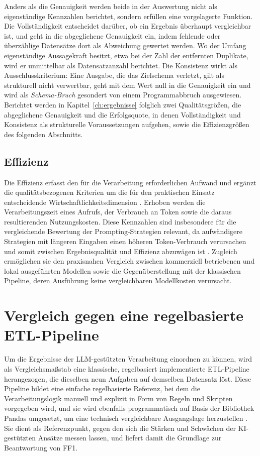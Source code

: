 Anders als die Genauigkeit werden beide in der Auswertung nicht als eigenständige Kennzahlen berichtet, sondern erfüllen eine vorgelagerte Funktion. Die Vollständigkeit entscheidet darüber, ob ein Ergebnis überhaupt vergleichbar ist, und geht in die abgeglichene Genauigkeit ein, indem fehlende oder überzählige Datensätze dort als Abweichung gewertet werden. Wo der Umfang eigenständige Aussagekraft besitzt, etwa bei der Zahl der entfernten Duplikate, wird er unmittelbar als Datensatzanzahl berichtet. Die Konsistenz wirkt als Ausschlusskriterium: Eine Ausgabe, die das Zielschema verletzt, gilt als strukturell nicht verwertbar, geht mit dem Wert null in die Genauigkeit ein und wird als \emph{Schema-Bruch} gesondert von einem Programmabbruch ausgewiesen. Berichtet werden in Kapitel~\ref{ch:ergebnisse} folglich zwei Qualitätsgrößen, die abgeglichene Genauigkeit und die Erfolgsquote, in denen Vollständigkeit und Konsistenz als strukturelle Voraussetzungen aufgehen, sowie die Effizienzgrößen des folgenden Abschnitts.

\subsection{Effizienz}
\label{subsec:effizienz}

Die Effizienz erfasst den für die Verarbeitung erforderlichen Aufwand und ergänzt die qualitätsbezogenen Kriterien um die für den praktischen Einsatz entscheidende Wirtschaftlichkeitsdimension \autocite{changEfficientPromptingMethods2024,2026AIIndex}. Erhoben werden die Verarbeitungszeit eines Aufrufs, der Verbrauch an Token sowie die daraus resultierenden Nutzungskosten. Diese Kennzahlen sind insbesondere für die vergleichende Bewertung der Prompting-Strategien relevant, da aufwändigere Strategien mit längeren Eingaben einen höheren Token-Verbrauch verursachen und somit zwischen Ergebnisqualität und Effizienz abzuwägen ist \autocite{changEfficientPromptingMethods2024,schulhoffPromptReportSystematic2025}. Zugleich ermöglichen sie den praxisnahen Vergleich zwischen kommerziell betriebenen und lokal ausgeführten Modellen sowie die Gegenüberstellung mit der klassischen Pipeline, deren Ausführung keine vergleichbaren Modellkosten verursacht.

\section{Vergleich gegen eine regelbasierte ETL-Pipeline}
\label{sec:baseline}

Um die Ergebnisse der \ac{LLM}-gestützten Verarbeitung einordnen zu können, wird als Vergleichsmaßstab eine klassische, regelbasiert implementierte \ac{ETL}-Pipeline herangezogen, die dieselben neun Aufgaben auf demselben Datensatz löst. Diese Pipeline bildet eine einfache regelbasierte Referenz, bei dem die Verarbeitungslogik manuell und explizit in Form von Regeln und Skripten vorgegeben wird, und sie wird ebenfalls programmatisch auf Basis der Bibliothek Pandas umgesetzt, um eine technisch vergleichbare Ausgangslage herzustellen \autocite{mishraAutomatingDataIntegration2020}. Sie dient als Referenzpunkt, gegen den sich die Stärken und Schwächen der \ac{KI}-gestützten Ansätze messen lassen, und liefert damit die Grundlage zur Beantwortung von FF1.


